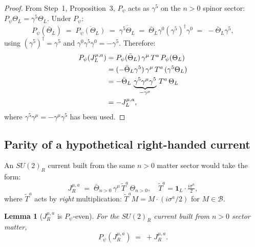 \documentclass[12pt,a4paper]{article}
\newtheorem{lemma}[theorem]{Lemma}
\theoremstyle{definition}
\theoremstyle{remark}
\begin{document}
\begin{proof}
From Step~1, Proposition~3, $P_\psi$ acts as $\gamma^5$ on the $n>0$ spinor sector:
$P_\psi\Theta_L = \gamma^5\Theta_L$.
Under $P_\psi$:
\begin{equation}
  P_\psi(\bar\Theta_L)
  \;=\;
  \overline{P_\psi(\Theta_L)}
  \;=\;
  \overline{\gamma^5\Theta_L}
  \;=\;
  \bar\Theta_L\gamma^0(\gamma^5)^\dagger\gamma^0
  \;=\;
  -\bar\Theta_L\gamma^5,
\end{equation}
using $(\gamma^5)^\dagger = \gamma^5$ and $\gamma^0\gamma^5\gamma^0 = -\gamma^5$.
Therefore:
\begin{align}
  P_\psi(J^{\mu,a}_L)
  &= P_\psi(\bar\Theta_L)\,\gamma^\mu\,T^a\,P_\psi(\Theta_L) \notag\\
  &= (-\bar\Theta_L\gamma^5)\,\gamma^\mu\,T^a\,(\gamma^5\Theta_L) \notag\\
  &= -\bar\Theta_L\,\underbrace{\gamma^5\gamma^\mu\gamma^5}_{-\gamma^\mu}\,T^a\,\Theta_L \notag\\
  &= -J^{\mu,a}_L,
\end{align}
where $\gamma^5\gamma^\mu = -\gamma^\mu\gamma^5$ has been used.
\end{proof}

\subsection{Parity of a hypothetical right-handed current}

An $SU(2)_R$ current built from the same $n>0$ matter sector would take the form:
\begin{equation}
  J^{\mu,a}_R
  \;=\;
  \bar\Theta_{n>0}\,\gamma^\mu\,\tilde{T}^a\,\Theta_{n>0},
  \quad
  \tilde{T}^a = \mathbf{1}_L\cdot\tfrac{i\sigma^a}{2},
\end{equation}
where $\tilde{T}^a$ acts by \emph{right} multiplication:
$\tilde{T}^a M = M\cdot(i\sigma^a/2)$ for $M\in\mathcal{B}$.

\begin{lemma}[$J^{\mu,a}_R$ is $P_\psi$-even]
\label{lem:JR_even}
For the $SU(2)_R$ current built from $n>0$ sector matter,
\begin{equation}
  P_\psi\!\left(J^{\mu,a}_R\right) \;=\; +J^{\mu,a}_R.
\end{equation}
\end{lemma}
\end{document}

